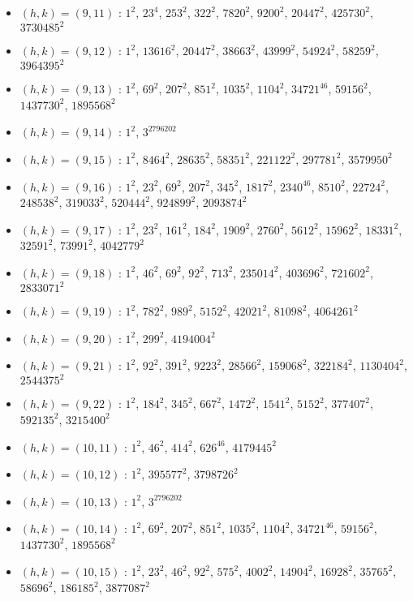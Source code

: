 \begin{itemize}
\item $(h,k)=(9,11)$ : $1^{2}$, $23^{4}$, $253^{2}$, $322^{2}$, $7820^{2}$, $9200^{2}$, $20447^{2}$, $425730^{2}$, $3730485^{2}$
\item $(h,k)=(9,12)$ : $1^{2}$, $13616^{2}$, $20447^{2}$, $38663^{2}$, $43999^{2}$, $54924^{2}$, $58259^{2}$, $3964395^{2}$
\item $(h,k)=(9,13)$ : $1^{2}$, $69^{2}$, $207^{2}$, $851^{2}$, $1035^{2}$, $1104^{2}$, $34721^{46}$, $59156^{2}$, $1437730^{2}$, $1895568^{2}$
\item $(h,k)=(9,14)$ : $1^{2}$, $3^{2796202}$
\item $(h,k)=(9,15)$ : $1^{2}$, $8464^{2}$, $28635^{2}$, $58351^{2}$, $221122^{2}$, $297781^{2}$, $3579950^{2}$
\item $(h,k)=(9,16)$ : $1^{2}$, $23^{2}$, $69^{2}$, $207^{2}$, $345^{2}$, $1817^{2}$, $2340^{46}$, $8510^{2}$, $22724^{2}$, $248538^{2}$, $319033^{2}$, $520444^{2}$, $924899^{2}$, $2093874^{2}$
\item $(h,k)=(9,17)$ : $1^{2}$, $23^{2}$, $161^{2}$, $184^{2}$, $1909^{2}$, $2760^{2}$, $5612^{2}$, $15962^{2}$, $18331^{2}$, $32591^{2}$, $73991^{2}$, $4042779^{2}$
\item $(h,k)=(9,18)$ : $1^{2}$, $46^{2}$, $69^{2}$, $92^{2}$, $713^{2}$, $235014^{2}$, $403696^{2}$, $721602^{2}$, $2833071^{2}$
\item $(h,k)=(9,19)$ : $1^{2}$, $782^{2}$, $989^{2}$, $5152^{2}$, $42021^{2}$, $81098^{2}$, $4064261^{2}$
\item $(h,k)=(9,20)$ : $1^{2}$, $299^{2}$, $4194004^{2}$
\item $(h,k)=(9,21)$ : $1^{2}$, $92^{2}$, $391^{2}$, $9223^{2}$, $28566^{2}$, $159068^{2}$, $322184^{2}$, $1130404^{2}$, $2544375^{2}$
\item $(h,k)=(9,22)$ : $1^{2}$, $184^{2}$, $345^{2}$, $667^{2}$, $1472^{2}$, $1541^{2}$, $5152^{2}$, $377407^{2}$, $592135^{2}$, $3215400^{2}$
\item $(h,k)=(10,11)$ : $1^{2}$, $46^{2}$, $414^{2}$, $626^{46}$, $4179445^{2}$
\item $(h,k)=(10,12)$ : $1^{2}$, $395577^{2}$, $3798726^{2}$
\item $(h,k)=(10,13)$ : $1^{2}$, $3^{2796202}$
\item $(h,k)=(10,14)$ : $1^{2}$, $69^{2}$, $207^{2}$, $851^{2}$, $1035^{2}$, $1104^{2}$, $34721^{46}$, $59156^{2}$, $1437730^{2}$, $1895568^{2}$
\item $(h,k)=(10,15)$ : $1^{2}$, $23^{2}$, $46^{2}$, $92^{2}$, $575^{2}$, $4002^{2}$, $14904^{2}$, $16928^{2}$, $35765^{2}$, $58696^{2}$, $186185^{2}$, $3877087^{2}$

\end{itemize}
